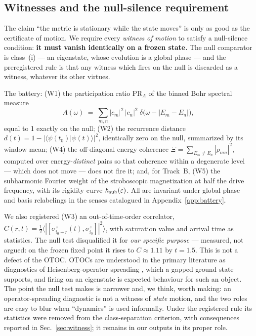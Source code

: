 \documentclass[a4paper,11pt,noarxiv]{quantumarticle}
\begin{document}
\subsection{Witnesses and the null-silence requirement}\label{sec:witnessdef}

The claim ``the metric is stationary while the state moves'' is only as
good as the certificate of motion. We require every \emph{witness of
motion} to satisfy a null-silence condition: \textbf{it must vanish
identically on a frozen state.} The null comparator is class~(i) ---
an eigenstate, whose evolution is a global phase --- and the
preregistered rule is that any witness which fires on the null is
discarded as a witness, whatever its other virtues.

The battery: (W1) the participation ratio $\mathrm{PR}_A$ of the binned
Bohr spectral measure
\begin{equation}
A(\omega) \;=\; \sum_{m,n}|c_m|^2\,|c_n|^2\;
\delta\!\big(\omega - |E_m-E_n|\big),
\end{equation}
equal to 1 exactly on the null; (W2) the recurrence
distance $d(t) = 1-|\langle\psi(t_0)|\psi(t)\rangle|^2$, identically
zero on the null, summarized by its window mean; (W4) the off-diagonal
energy coherence $\Xi = \sum_{E_m\neq E_n}|\rho_{mn}|^2$, computed over
energy-\emph{distinct} pairs so that coherence within a degenerate
level --- which does not move --- does not fire it; and, for Track~B,
(W5) the subharmonic Fourier weight of the stroboscopic magnetization
at half the drive frequency, with its rigidity curve $h_{\rm
sub}(\varepsilon)$. All are invariant under global phase and basis
relabelings in the senses catalogued in Appendix~\ref{app:battery}.

We also registered (W3) an out-of-time-order correlator,
$C(r,t)=\tfrac12\langle|[\sigma^z_{i_0+r}(t),\sigma^z_{i_0}]|^2\rangle$,
with saturation value and arrival time as statistics. The null test
disqualified it for \emph{our specific purpose} --- measured, not
argued: on the frozen fixed point it rises to $C\approx 1.11$ by
$t=1.5$. This is not a defect of the OTOC. OTOCs are understood in the
primary literature as diagnostics of Heisenberg-operator spreading
\cite{SRC064}, which a gapped ground state supports, and firing on an
eigenstate is expected behaviour for such an object. The point the
null test makes is narrower and, we think, worth making: an
operator-spreading diagnostic is not a witness of \emph{state} motion,
and the two roles are easy to blur when ``dynamics'' is used
informally. Under the registered rule its statistics were removed from
the class-separation criterion, with consequences reported in
Sec.~\ref{sec:witness}; it remains in our outputs in its proper role.
\end{document}
